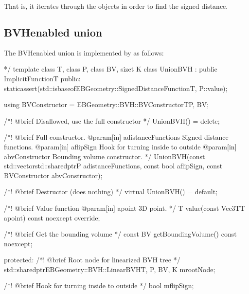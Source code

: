\documentclass[letterpaper,10pt,english]{sphinxmanual}
\begin{document}
\sphinxAtStartPar
That is, it iterates through  the objects in order to find the signed distance.


\subsection{BVH\sphinxhyphen{}enabled union}
\label{\detokenize{ImplemUnion:bvh-enabled-union}}
\sphinxAtStartPar
The BVH\sphinxhyphen{}enabled union is implemented by  as follows:

\begin{sphinxVerbatim}[commandchars=\\\{\}]
*/
template \PYGZlt{}class T, class P, class BV, size\PYGZus{}t K\PYGZgt{}
class UnionBVH : public ImplicitFunction\PYGZlt{}T\PYGZgt{}
\PYGZob{}
public:
  static\PYGZus{}assert(std::is\PYGZus{}base\PYGZus{}of\PYGZlt{}EBGeometry::SignedDistanceFunction\PYGZlt{}T\PYGZgt{}, P\PYGZgt{}::value);

  using BVConstructor = EBGeometry::BVH::BVConstructorT\PYGZlt{}P, BV\PYGZgt{};

  /*!
    @brief Disallowed, use the full constructor
  */
  UnionBVH() = delete;

  /*!
    @brief Full constructor.
    @param[in] a\PYGZus{}distanceFunctions Signed distance functions.
    @param[in] a\PYGZus{}flipSign          Hook for turning inside to outside
    @param[in] a\PYGZus{}bvConstructor     Bounding volume constructor.
  */
  UnionBVH(const std::vector\PYGZlt{}std::shared\PYGZus{}ptr\PYGZlt{}P\PYGZgt{}\PYGZgt{}\PYGZam{} a\PYGZus{}distanceFunctions,
           const bool                             a\PYGZus{}flipSign,
           const BVConstructor\PYGZam{}                   a\PYGZus{}bvConstructor);

  /*!
    @brief Destructor (does nothing)
  */
  virtual \PYGZti{}UnionBVH() = default;

  /*!
    @brief Value function
    @param[in] a\PYGZus{}point 3D point.
  */
  T
  value(const Vec3T\PYGZlt{}T\PYGZgt{}\PYGZam{} a\PYGZus{}point) const noexcept override;

  /*!
    @brief Get the bounding volume
  */
  const BV\PYGZam{}
  getBoundingVolume() const noexcept;

protected:
  /*!
    @brief Root node for linearized BVH tree
  */
  std::shared\PYGZus{}ptr\PYGZlt{}EBGeometry::BVH::LinearBVH\PYGZlt{}T, P, BV, K\PYGZgt{}\PYGZgt{} m\PYGZus{}rootNode;

  /*!
    @brief Hook for turning inside to outside
  */
  bool m\PYGZus{}flipSign;


\end{sphinxVerbatim}
\end{document}
